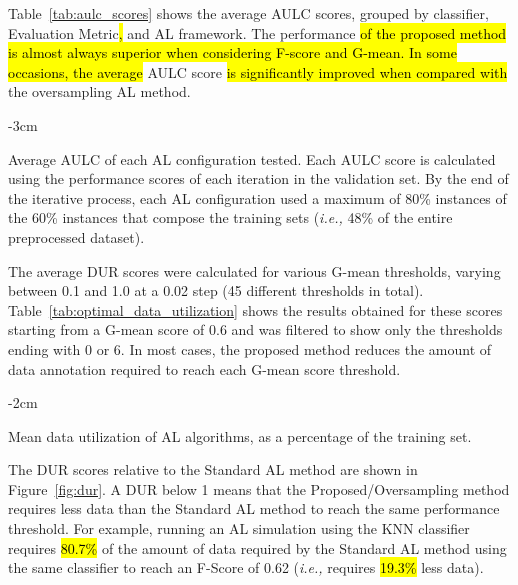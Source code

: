 \documentclass[preprint, 12pt]{elsarticle}
\begin{document}
Table~\ref{tab:aulc_scores} shows the average AULC scores, grouped by
classifier, Evaluation Metric\hl{,} and AL framework. The 
performance \hl{of the proposed method is almost always superior when
considering F-score and G-mean. In some occasions, the average} AULC score
\hl{is significantly improved when compared with} the oversampling AL method.

\begin{table}
	\centering
    \addtolength{\leftskip} {-3cm}
    \addtolength{\rightskip}{-3cm}
    \caption{\label{tab:aulc_scores}
        Average AULC of each AL configuration tested. Each AULC score is
        calculated using the performance scores of each iteration in the
        validation set. By the end of the iterative process, each AL
        configuration used a maximum of 80\% instances of the 60\% instances
        that compose the training sets (\textit{i.e.,} 48\% of the entire
        preprocessed dataset).
    }
\end{table}

The average DUR scores were calculated for various G-mean thresholds, varying
between 0.1 and 1.0 at a 0.02 step (45 different thresholds in total).
Table~\ref{tab:optimal_data_utilization} shows the results obtained for these
scores starting from a G-mean score of 0.6 and was filtered to show only the
thresholds ending with 0 or 6. In most cases, the proposed method reduces the
amount of data annotation required to reach each G-mean score threshold.

\begin{table}
    \centering
    \addtolength{\leftskip} {-2cm}
    \addtolength{\rightskip}{-2cm}
    \caption{\label{tab:optimal_data_utilization}
        Mean data utilization of AL algorithms, as a percentage of the
        training set.
    }
\end{table}

The DUR scores relative to the Standard AL method are shown in
Figure~\ref{fig:dur}. A DUR below 1 means that the Proposed/Oversampling
method requires less data than the Standard AL method to reach the same
performance threshold. For example, running an AL simulation using the KNN
classifier requires \hl{80.7\%} of the amount of data required by the Standard AL
method using the same classifier to reach an F-Score of 0.62 (\textit{i.e.,}
requires \hl{19.3\%} less data).
\end{document}
